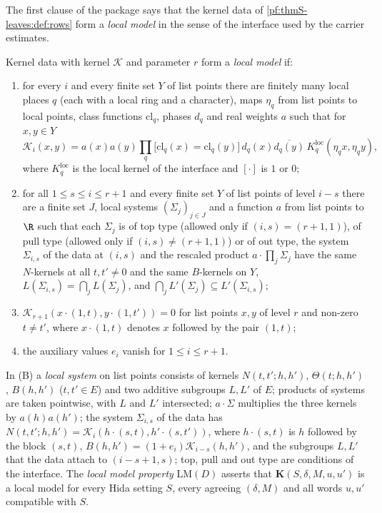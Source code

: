 The first clause of the package says that the kernel data of \cref{pf:thmS-leaves:def:rows} form a \emph{local model} in the
sense of the interface used by the carrier estimates.

\begin{definition}\label{pf:thmS-leaves:def:LM}
Kernel data with kernel $\mathcal K$ and parameter $r$ form a \emph{local model} if:
\begin{enumerate}[label=(\Alph*)]
\item for every $i$ and every finite set $Y$ of list points there are finitely many local places $q$ (each with a local ring
and a character), maps $\eta_q$ from list points to local points, class functions $\mathrm{cl}_q$, phases $d_q$ and real weights
$a$ such that for $x,y\in Y$
\[
\mathcal K_i(x,y)=a(x)a(y)\prod_q\bigl[\mathrm{cl}_q(x)=\mathrm{cl}_q(y)\bigr]\,d_q(x)\overline{d_q(y)}\,K^{\mathrm{loc}}_q(\eta_qx,\eta_qy),
\]
where $K^{\mathrm{loc}}_q$ is the local kernel of the interface and $[\cdot]$ is $1$ or $0$;
\item for all $1\le s\le i\le r+1$ and every finite set $Y$ of list points of level $i-s$ there are a finite set $J$, local
systems $(\Sigma_j)_{j\in J}$ and a function $a$ from list points to $\R$ such that each $\Sigma_j$ is of top type (allowed only if
$(i,s)=(r+1,1)$), of pull type (allowed only if $(i,s)\ne(r+1,1)$) or of out type, the system $\Sigma_{i,s}$ of the data at $(i,s)$
and the rescaled product $a\cdot\prod_j\Sigma_j$ have the same $N$-kernels at all $t,t'\ne0$ and the same $B$-kernels on $Y$,
$L(\Sigma_{i,s})=\bigcap_jL(\Sigma_j)$, and $\bigcap_jL'(\Sigma_j)\subseteq L'(\Sigma_{i,s})$;
\item $\mathcal K_{r+1}(x\cdot(1,t),y\cdot(1,t'))=0$ for list points $x,y$ of level $r$ and non-zero $t\ne t'$, where $x\cdot(1,t)$ denotes
$x$ followed by the pair $(1,t)$;
\item the auxiliary values $e_i$ vanish for $1\le i\le r+1$.
\end{enumerate}
In (B) a \emph{local system} on list points consists of kernels $N(t,t';h,h')$, $\Theta(t;h,h')$, $B(h,h')$ ($t,t'\in E$) and two
additive subgroups $L,L'$ of $E$; products of systems are taken pointwise, with $L$ and $L'$ intersected; $a\cdot\Sigma$ multiplies
the three kernels by $a(h)a(h')$; the system $\Sigma_{i,s}$ of the data has $N(t,t';h,h')=\mathcal K_i(h\cdot(s,t),h'\cdot(s,t'))$,
where $h\cdot(s,t)$ is $h$ followed by the block $(s,t)$, $B(h,h')=(1+e_i)\mathcal K_{i-s}(h,h')$, and the subgroups $L,L'$ that
the data attach to $(i-s+1,s)$; top, pull and out type are conditions of the interface.
The \emph{local model property} $\mathrm{LM}(D)$ asserts that $\mathbf K(S,\delta,M,u,u')$ is a local model for every Hida setting
$S$, every agreeing $(\delta,M)$ and all words $u,u'$ compatible with $S$.
\end{definition}

